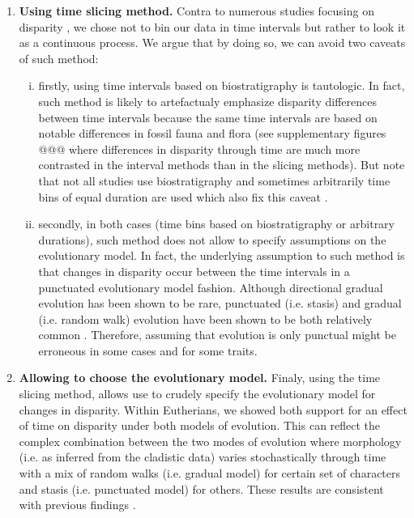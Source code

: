 \documentclass[12pt,letterpaper]{article}
\begin{document}
\begin{enumerate}
    \item \textbf{Using time slicing method.}
    Contra to numerous studies focusing on disparity \citep[e.g][]{cisneros2010,prentice2011,Hughes20082013,hopkinsdecoupling2013,bentonmodels2014,bensonfaunal2014}, we chose not to bin our data in time intervals but rather to look it as a continuous process.
    We argue that by doing so, we can avoid two caveats of such method: 
    \begin{enumerate}[(i)]
        \item firstly, using time intervals based on biostratigraphy is tautologic.
        In fact, such method is likely to artefactualy emphasize disparity differences between time intervals because the same time intervals are based on notable differences in fossil fauna and flora (see supplementary figures @@@ where differences in disparity through time are much more contrasted in the interval methods than in the slicing methods).
        But note that not all studies use biostratigraphy and sometimes arbitrarily time bins of equal duration are used which also fix this caveat \citep{Butler2012,hopkinsdecoupling2013,bensonfaunal2014}.
        \item secondly, in both cases (time bins based on biostratigraphy or arbitrary durations), such method does not allow to specify assumptions on the evolutionary model.
        In fact, the underlying assumption to such method is that changes in disparity occur between the time intervals in a punctuated evolutionary model fashion.
        Although directional gradual evolution has been shown to be rare, punctuated (i.e. stasis) and gradual (i.e. random walk) evolution have been shown to be both relatively common \citep{Hunt20112007,Hunt21042015}.
        Therefore, assuming that evolution is only punctual might be erroneous in some cases and for some traits.
    \end{enumerate}
    \item \textbf{Allowing to choose the evolutionary model.}
    Finaly, using the time slicing method, allows use to crudely specify the evolutionary model for changes in disparity.
    Within Eutherians, we showed both support for an effect of time on disparity under both models of evolution.
    This can reflect the complex combination between the two modes of evolution where morphology (i.e. as inferred from the cladistic data) varies stochastically through time with a mix of random walks (i.e. gradual model) for certain set of characters and stasis (i.e. punctuated model) for others.
    These results are consistent with previous findings \citep{Hunt20112007,Hunt21042015}.

\end{enumerate}
\end{document}
